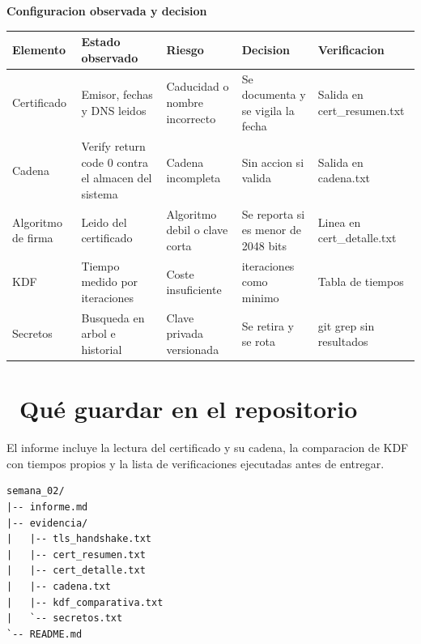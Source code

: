 \documentclass[11pt,a4paper]{article}
\newcommand{\iconotexto}[2]{\textcolor{cyanNeon}{\faIcon{#1}}~#2}
\begin{document}
\begin{center}
\begin{minipage}{\linewidth}
\centering
{\footnotesize
\textbf{Configuracion observada y decision}\par\smallskip
\begin{tabular}{@{}>{\raggedright\arraybackslash}p{2.40cm}>{\raggedright\arraybackslash}p{3.20cm}>{\raggedright\arraybackslash}p{2.40cm}>{\raggedright\arraybackslash}p{3.20cm}>{\raggedright\arraybackslash}p{2.90cm}@{}}
\toprule
\textbf{Elemento} & \textbf{Estado observado} & \textbf{Riesgo} & \textbf{Decision} & \textbf{Verificacion} \\
\midrule
Certificado & Emisor, fechas y DNS leidos & Caducidad o nombre incorrecto & Se documenta y se vigila la fecha & Salida en cert\_resumen.txt \\
Cadena & Verify return code 0 contra el almacen del sistema & Cadena incompleta & Sin accion si valida & Salida en cadena.txt \\
Algoritmo de firma & Leido del certificado & Algoritmo debil o clave corta & Se reporta si es menor de 2048 bits & Linea en cert\_detalle.txt \\
KDF & Tiempo medido por iteraciones & Coste insuficiente & 600000 iteraciones como minimo & Tabla de tiempos \\
Secretos & Busqueda en arbol e historial & Clave privada versionada & Se retira y se rota & git grep sin resultados \\
\bottomrule
\end{tabular}
}
\par{}
\end{minipage}
\end{center}

\section{\iconotexto{box-open}{Qué guardar en el repositorio}}

El informe incluye la lectura del certificado y su cadena, la comparacion de KDF con tiempos propios y la lista de verificaciones ejecutadas antes de entregar.

\begin{lstlisting}[style=estiloCodigo]
semana_02/
|-- informe.md
|-- evidencia/
|   |-- tls_handshake.txt
|   |-- cert_resumen.txt
|   |-- cert_detalle.txt
|   |-- cadena.txt
|   |-- kdf_comparativa.txt
|   `-- secretos.txt
`-- README.md
\end{lstlisting}
\end{document}
